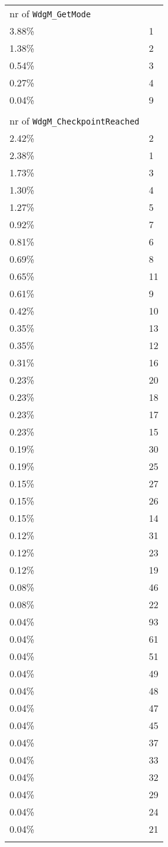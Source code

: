 \begin{longtable}{l l}
nr of \verb!WdgM_GetMode!\\
3.88\% & 1\\
1.38\% & 2\\
0.54\% & 3\\
0.27\% & 4\\
0.04\% & 9\\\\

nr of \verb!WdgM_CheckpointReached!\\
2.42\% & 2\\
2.38\% & 1\\
1.73\% & 3\\
1.30\% & 4\\
1.27\% & 5\\
0.92\% & 7\\
0.81\% & 6\\
0.69\% & 8\\
0.65\% & 11\\
0.61\% & 9\\
0.42\% & 10\\
0.35\% & 13\\
0.35\% & 12\\
0.31\% & 16\\
0.23\% & 20\\
0.23\% & 18\\
0.23\% & 17\\
0.23\% & 15\\
0.19\% & 30\\
0.19\% & 25\\
0.15\% & 27\\
0.15\% & 26\\
0.15\% & 14\\
0.12\% & 31\\
0.12\% & 23\\
0.12\% & 19\\
0.08\% & 46\\
0.08\% & 22\\
0.04\% & 93\\
0.04\% & 61\\
0.04\% & 51\\
0.04\% & 49\\
0.04\% & 48\\
0.04\% & 47\\
0.04\% & 45\\
0.04\% & 37\\
0.04\% & 33\\
0.04\% & 32\\
0.04\% & 29\\
0.04\% & 24\\
0.04\% & 21\\\\



\end{longtable}
